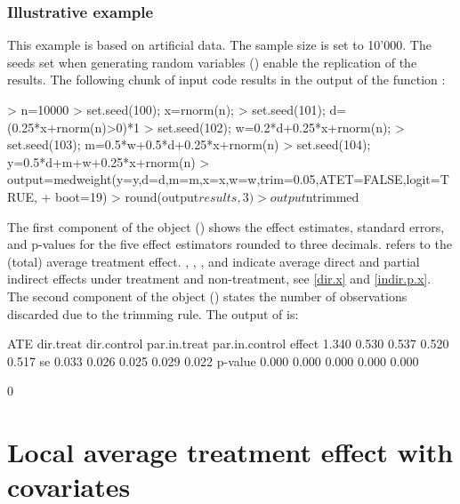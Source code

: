 \documentclass[nojss]{jss}
\begin{document}
\subsubsection{Illustrative example}\label{exmed}

This example is based on artificial data. The sample size  is set to 10'000. The seeds set when generating random variables () enable the replication of the results. The following chunk of  input code results in the output of the function :

\begin{Schunk}
\begin{Sinput}
> n=10000
> set.seed(100); x=rnorm(n);
> set.seed(101); d=(0.25*x+rnorm(n)>0)*1
> set.seed(102); w=0.2*d+0.25*x+rnorm(n);
> set.seed(103); m=0.5*w+0.5*d+0.25*x+rnorm(n)
> set.seed(104); y=0.5*d+m+w+0.25*x+rnorm(n)
> output=medweight(y=y,d=d,m=m,x=x,w=w,trim=0.05,ATET=FALSE,logit=TRUE,
+ boot=19)
> round(output$results,3)
> output$ntrimmed
\end{Sinput}
\end{Schunk}

The first component of the  object () shows the effect estimates, standard errors, and p-values for the five effect estimators rounded to three decimals.  refers to the (total) average treatment effect. , , , and  indicate average direct and partial indirect effects under treatment and non-treatment, see \eqref{dir.x} and \eqref{indir.p.x}. The second component of the  object () states the number of observations discarded due to the trimming rule. The output of  is:

\begin{Schunk}
\begin{Soutput}
          ATE dir.treat dir.control par.in.treat par.in.control
effect  1.340     0.530       0.537        0.520          0.517
se      0.033     0.026       0.025        0.029          0.022
p-value 0.000     0.000       0.000        0.000          0.000
\end{Soutput}
\begin{Soutput}
[1] 0
\end{Soutput}
\end{Schunk}

\section{Local average treatment effect with covariates}\label{late}
\end{document}
